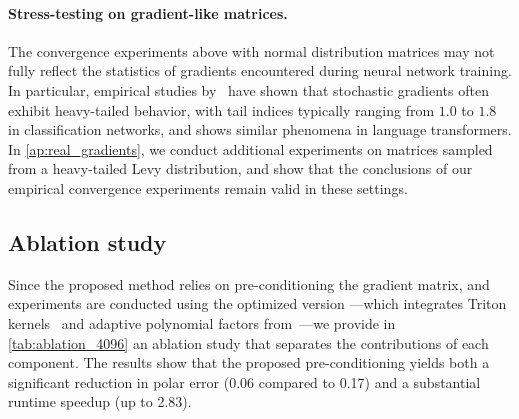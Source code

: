 \paragraph{Stress-testing on gradient-like matrices.} The convergence experiments above with normal distribution matrices may not fully reflect the statistics of gradients encountered during neural network training. In particular, empirical studies by~\citet{Simsekli2019TailIndex} have shown that stochastic gradients often exhibit heavy-tailed behavior, with tail indices typically ranging from $1.0$ to $1.8$ in classification networks, and \citep{kunstner2024heavy} shows similar phenomena in language transformers. 
In \cref{ap:real_gradients}, we conduct additional experiments on matrices sampled from a heavy-tailed Levy distribution, and show that the conclusions of our empirical convergence experiments remain valid in these settings.

\subsection{Ablation study}

Since the proposed method relies on pre-conditioning the gradient matrix, and experiments are conducted using the optimized version \color{dioncolor}{Muon+}\color{black}—which integrates Triton kernels~\cite{tillet2019triton} and adaptive polynomial factors from~\cite{cesista2025muonoptcoeffs}—we provide in \cref{tab:ablation_4096} an ablation study that separates the contributions of each component. The results show that the proposed pre-conditioning yields both a significant reduction in polar error (0.06 compared to 0.17) and a substantial runtime speedup (up to 2.83).

